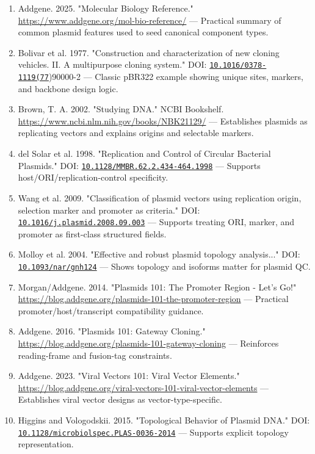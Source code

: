 \documentclass[11pt]{report}
\begin{document}
\begin{enumerate}
\item Addgene. 2025. "Molecular Biology Reference." \url{https://www.addgene.org/mol-bio-reference/} — Practical summary of common plasmid features used to seed canonical component types.
\item Bolivar et al. 1977. "Construction and characterization of new cloning vehicles. II. A multipurpose cloning system." DOI: \href{https://doi.org/10.1016/0378-1119(77}{\nolinkurl{10.1016/0378-1119(77}})90000-2 — Classic pBR322 example showing unique sites, markers, and backbone design logic.
\item Brown, T. A. 2002. "Studying DNA." NCBI Bookshelf. \url{https://www.ncbi.nlm.nih.gov/books/NBK21129/} — Establishes plasmids as replicating vectors and explains origins and selectable markers.
\item del Solar et al. 1998. "Replication and Control of Circular Bacterial Plasmids." DOI: \href{https://doi.org/10.1128/MMBR.62.2.434-464.1998}{\nolinkurl{10.1128/MMBR.62.2.434-464.1998}} — Supports host/ORI/replication-control specificity.
\item Wang et al. 2009. "Classification of plasmid vectors using replication origin, selection marker and promoter as criteria." DOI: \href{https://doi.org/10.1016/j.plasmid.2008.09.003}{\nolinkurl{10.1016/j.plasmid.2008.09.003}} — Supports treating ORI, marker, and promoter as first-class structured fields.
\item Molloy et al. 2004. "Effective and robust plasmid topology analysis..." DOI: \href{https://doi.org/10.1093/nar/gnh124}{\nolinkurl{10.1093/nar/gnh124}} — Shows topology and isoforms matter for plasmid QC.
\item Morgan/Addgene. 2014. "Plasmids 101: The Promoter Region - Let's Go!" \url{https://blog.addgene.org/plasmids-101-the-promoter-region} — Practical promoter/host/transcript compatibility guidance.
\item Addgene. 2016. "Plasmids 101: Gateway Cloning." \url{https://blog.addgene.org/plasmids-101-gateway-cloning} — Reinforces reading-frame and fusion-tag constraints.
\item Addgene. 2023. "Viral Vectors 101: Viral Vector Elements." \url{https://blog.addgene.org/viral-vectors-101-viral-vector-elements} — Establishes viral vector designs as vector-type-specific.
\item Higgins and Vologodskii. 2015. "Topological Behavior of Plasmid DNA." DOI: \href{https://doi.org/10.1128/microbiolspec.PLAS-0036-2014}{\nolinkurl{10.1128/microbiolspec.PLAS-0036-2014}} — Supports explicit topology representation.
\end{enumerate}
\end{document}
